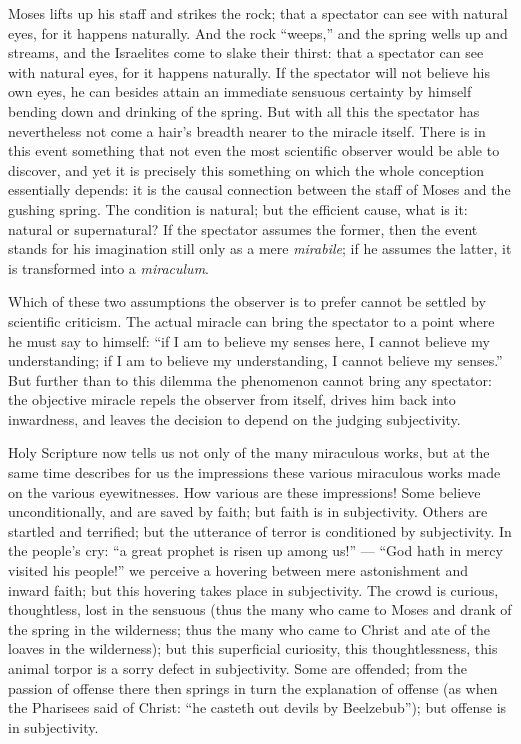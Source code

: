\documentclass[12pt,a4paper]{book}
\begin{document}
Moses lifts up his staff and strikes the rock; that a spectator can see with
natural eyes, for it happens naturally. And the rock ``weeps,'' and the spring
wells up and streams, and the Israelites come to slake their thirst: that a
spectator can see with natural eyes, for it happens naturally. If the spectator
will not believe his own eyes, he can besides attain an immediate sensuous
certainty by himself bending down and drinking of the spring. But with all this the
spectator has nevertheless not come a hair's breadth nearer to the miracle itself.
There is in this event something that not even the most scientific observer would
be able to discover, and yet it is precisely this something on which the whole
conception essentially depends: it is the causal connection between the staff of
Moses and the gushing spring. The condition is natural; but the efficient cause,
what is it: natural or supernatural? If the spectator assumes the former, then the
event stands for his imagination still only as a mere \textit{mirabile}; if he
assumes the latter, it is transformed into a \textit{miraculum}.

Which of these two assumptions the observer is to prefer cannot be settled by
scientific criticism. The actual miracle can bring the spectator to a point where
he must say to himself: ``if I am to believe my senses here, I cannot believe my
understanding; if I am to believe my understanding, I cannot believe my senses.''
But further than to this dilemma the phenomenon cannot bring any spectator: the
objective miracle repels the observer from itself, drives him back into inwardness,
and leaves the decision to depend on the judging subjectivity.

Holy Scripture now tells us not only of the many miraculous works, but at the same
time describes for us the impressions these
various miraculous works made on the various eyewitnesses. How various are these
impressions! Some believe unconditionally, and are saved by faith; but faith is in
subjectivity. Others are startled and terrified; but the utterance of terror is
conditioned by subjectivity. In the people's cry: ``a great prophet is risen up
among us!'' --- ``God hath in mercy visited his people!'' we perceive a hovering
between mere astonishment and inward faith; but this hovering takes place in
subjectivity. The crowd is curious, thoughtless, lost in the sensuous (thus the
many who came to Moses and drank of the spring in the wilderness; thus the many who
came to Christ and ate of the loaves in the wilderness); but this superficial
curiosity, this thoughtlessness, this animal torpor is a sorry defect in
subjectivity. Some are offended; from the passion of offense there then springs in
turn the explanation of offense (as when the Pharisees said of Christ: ``he casteth
out devils by Beelzebub''); but offense is in subjectivity.
\end{document}

